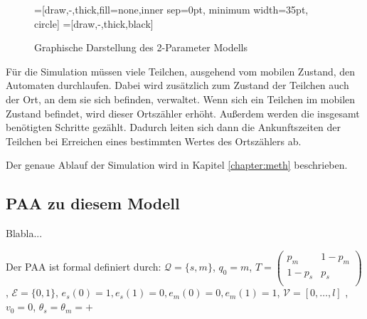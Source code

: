 \begin{figure}[ht]
 \centering

\usetikzlibrary{arrows,%
                topaths}%
=[draw,-,thick,fill=none,inner sep=0pt, minimum width=35pt, circle]
=[draw,-,thick,black]
\usetikzlibrary{arrows,decorations.pathmorphing,backgrounds,positioning,fit}


\caption{Graphische Darstellung des 2-Parameter Modells}
\label{tikz:2p_Mod}
\end{figure}

Für die Simulation müssen viele Teilchen, ausgehend vom mobilen Zustand, den Automaten durchlaufen. Dabei wird zusätzlich zum Zustand der Teilchen auch der Ort, an dem sie sich befinden, verwaltet. Wenn sich ein Teilchen im mobilen Zustand befindet, wird dieser Ortszähler erhöht. Außerdem werden die insgesamt benötigten Schritte gezählt. Dadurch leiten sich dann die Ankunftszeiten der Teilchen bei Erreichen eines bestimmten Wertes des Ortszählers ab.

Der genaue Ablauf der Simulation wird in Kapitel \ref{chapter:meth} beschrieben.


\subsection{PAA zu diesem Modell}
Blabla...

Der PAA ist formal definiert durch: $\mathcal{Q} = \{s, m\}$, $q_0 = m$, $T =
 \begin{pmatrix}
  p_{m} & 1-p_{m}  \\
  1-p_{s} & p_{s} \\
 \end{pmatrix}$, $\mathcal{E} = \{0, 1\}$, $e_s(0) = 1, e_s(1)=0, e_m(0) = 0, e_m(1)=1$,
 $\mathcal{V} = [0, \ldots, l]$ , $v_0 = 0$, $\theta_s = \theta_m = + $

